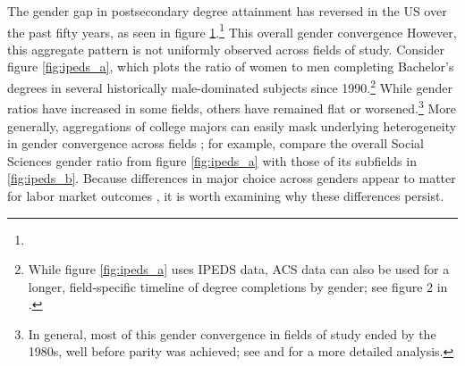 \begin{figure}[b!] %
\centering

\label{fig:n_degrees}
\end{figure}
\begin{figure}[t!] %
\centering

\end{figure}

The gender gap in postsecondary degree attainment has reversed in the US over the past fifty years, as seen in figure \ref{fig:n_degrees}.\footnote{
}
This overall gender convergence   
 However, this aggregate pattern is not uniformly observed across fields of study.
Consider figure \ref{fig:ipeds_a}, which plots the ratio of women to men completing Bachelor's degrees in several historically male-dominated subjects since 1990.\footnote{
    While figure \ref{fig:ipeds_a} uses IPEDS data, ACS data can also be used for a longer, field-specific timeline of degree completions by gender; see figure 2 in \textcite{SHB19}.
}
While gender ratios have increased in some fields, others have remained flat or worsened.\footnote{
    In general, most of this gender convergence in fields of study ended by the 1980s, well before parity was achieved; see \textcite{EL06} and \textcite{SHB19} for a more detailed analysis. 
}
More generally, aggregations of college majors can easily mask underlying heterogeneity in gender convergence across fields \parencite{BHST08}; for example, compare the overall Social Sciences gender ratio from figure \ref{fig:ipeds_a} with those of its subfields in \ref{fig:ipeds_b}.
Because differences in major choice across genders appear to matter for labor market outcomes \parencite{SHB19}, it is worth examining why these differences persist.

